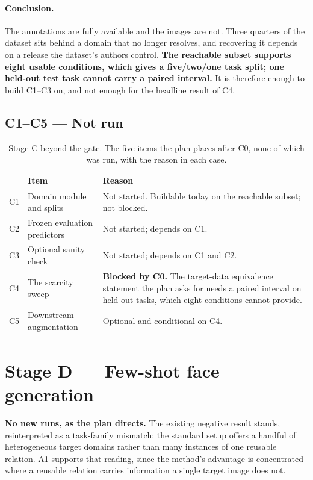 \documentclass{article}
\begin{document}
\paragraph{Conclusion.} The annotations are fully available and the images are not. Three
quarters of the dataset sits behind a domain that no longer resolves, and recovering it
depends on a release the dataset's authors control. \textbf{The reachable subset supports
eight usable conditions, which gives a five/two/one task split; one held-out test task cannot
carry a paired interval.} It is therefore enough to build C1--C3 on, and not enough for the
headline result of C4.

\subsection{C1--C5 --- Not run}

\begin{table}[h]
\centering
\small
\begin{tabular}{llp{8.2cm}}
\toprule
& Item & Reason\\
\midrule
C1 & Domain module and splits & Not started. Buildable today on the reachable subset; not blocked.\\
C2 & Frozen evaluation predictors & Not started; depends on C1.\\
C3 & Optional sanity check & Not started; depends on C1 and C2.\\
C4 & The scarcity sweep & \textbf{Blocked by C0.} The target-data equivalence statement the plan asks for needs a paired interval on held-out tasks, which eight conditions cannot provide.\\
C5 & Downstream augmentation & Optional and conditional on C4.\\
\bottomrule
\end{tabular}
\caption{Stage C beyond the gate. The five items the plan places after C0, none of which was
run, with the reason in each case.}
\end{table}

\FloatBarrier

\section{Stage D --- Few-shot face generation}

\textbf{No new runs, as the plan directs.} The existing negative result stands, reinterpreted
as a task-family mismatch: the standard setup offers a handful of heterogeneous target
domains rather than many instances of one reusable relation. A1 supports that reading, since
the method's advantage is concentrated where a reusable relation carries information a single
target image does not.
\end{document}
